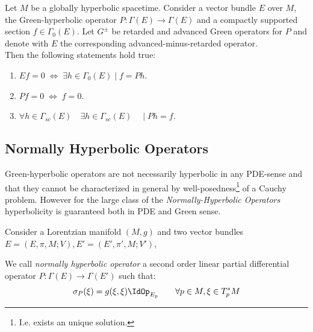 \documentclass[Main]{subfiles}
\begin{document}
			\begin{corollary}\label{Corol:GreenKernel}
				Let $M$ be a globally hyperbolic spacetime. Consider a vector bundle $E$ over $M$, the Green-hyperbolic operator $P: \Gamma(E)\rightarrow \Gamma(E)$ and a compactly supported section $f\in \Gamma_{0}(E)$.
				Let $G^\pm$ be retarded and advanced Green operators for $P$ and denote with $E$ the corresponding advanced-minus-retarded operator.\\
				Then the following statements hold true:
					\begin{enumerate}
						\item $E f = 0 \; \Leftrightarrow \;  \exists h \in \Gamma_{0}(E) \; \vert \; f=P h $.
						\item $P f = 0 \; \Leftrightarrow \; f=0$.
						\item $\forall h \in \Gamma_{sc}(E)\quad \exists h \in \Gamma_{sc}(E)\quad \; \vert \; P h = f$.
					\end{enumerate}
			\end{corollary}

		\subsection{Normally Hyperbolic Operators}
			Green-hyperbolic operators are not necessarily hyperbolic in any PDE-sense and that they cannot be characterized in general by well-posedness\footnote{I.e. exists an unique solution.} of a Cauchy problem.
			However  for the large class of the \emph{Normally-Hyperbolic Operators} hyperbolicity is guaranteed both in PDE and Green sense.

		Consider a Lorentzian manifold $(M,g)$ and two vector bundles $E=(E,\pi,M;V), E'=(E',\pi',M;V')$,
		\begin{definition}\label{Def:NormalHyperOper}
			We call \emph{normally hyperbolic operator} a second order linear partial differential operator $P:\Gamma(E)\rightarrow \Gamma(E')$ such that:
			\begin{displaymath}
				\sigma_P(\xi) = g(\xi,\xi) \IdOp_{E_p} \qquad \forall p\in M, \xi \in T^*_pM
			\end{displaymath}
		\end{definition}
\end{document}
